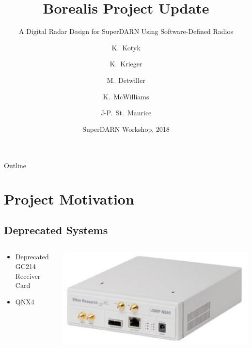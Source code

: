 \documentclass{beamer}
\title{Borealis Project Update}
\subtitle{A Digital Radar Design for SuperDARN Using Software-Defined Radios}
\author{K.~Kotyk \and K.~Krieger \and M.~Detwiller \and K.~McWilliams \and J-P.~St.~Maurice}
\institute[University of Saskatchewan] %
\date{SuperDARN Workshop, 2018}
\begin{document}
\begin{frame}
  \titlepage
\end{frame}

\begin{frame}{Outline}
  \tableofcontents
\end{frame}

\section{Project Motivation}

\subsection{Deprecated Systems}

\begin{frame}
  \begin{columns}[T]
    \begin{column}{.5\textwidth}
      \begin{block}{}
     \begin{itemize}
      \item<bullet@1-> Deprecated GC214 Receiver Card
      \item<bullet@1-> QNX4
     \end{itemize}
    \end{block}
    \end{column}
    
    \begin{column}{.5\textwidth}
    \begin{block}{}
    \includegraphics[width=\textwidth]{n200.eps}
    \end{block}
    \end{column}
  \end{columns}
\end{frame}
\end{document}
